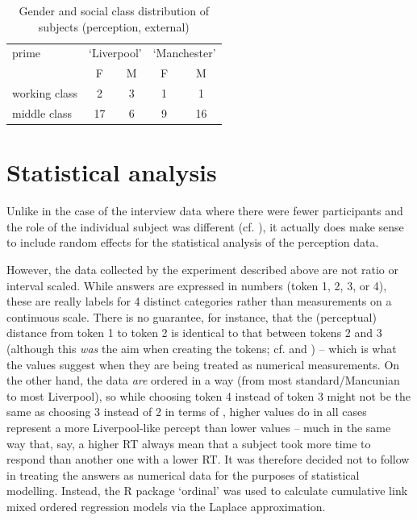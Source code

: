 \begin{table}
	\caption[Gender and {social class} of subjects (perception)]{Gender and {social class} distribution of subjects (perception, external)}
	\label{tab.participants.perception}
	
	\begin{tabular}{lcccc}
		\toprule
		prime\is{priming} & \multicolumn{2}{c}{`Liverpool'} & \multicolumn{2}{c}{`Manchester'}\\
		& F & M & F & M\\
		\midrule
		working class & 2 & 3 & 1 & 1\\
		middle class & 17 & 6 & 9 & 16\\
		\bottomrule
	\end{tabular}
\end{table}

\section{Statistical analysis}\label{sec.perc_method.stats}

Unlike in the case of the interview data where there were fewer participants and the role of the individual subject was different (cf. ), it actually does make sense to include random effects for the statistical analysis of the perception data.

However, the data collected by the experiment described above are not ratio or interval scaled.
While answers are expressed in numbers (token 1, 2, 3, or 4), these are really labels for 4 distinct categories rather than measurements on a continuous scale.
There is no guarantee, for instance, that the (perceptual) distance from token 1 to token 2 is identical to that between tokens 2 and 3 (although this \emph{was} the aim when creating the tokens; cf.   and ) -- which is what the values suggest when they are being treated as numerical measurements.
On the other hand, the data \emph{are} ordered in a way (from most standard/Mancunian to most Liverpool), so while choosing token 4 instead of token 3 might not be the same as choosing 3 instead of 2 in terms of , higher values do in all cases represent a more Liverpool-like percept than lower values -- much in the same way that, say, a higher RT always mean that a subject took more time to respond than another one with a lower RT.
It was therefore decided not to follow \citealt{hayetal2006a,haydrager2010} in treating the answers as numerical data for the purposes of statistical modelling.
Instead, the R package `ordinal' \parencite{Rordinal} was used to calculate cumulative link mixed ordered regression models via the Laplace approximation.

